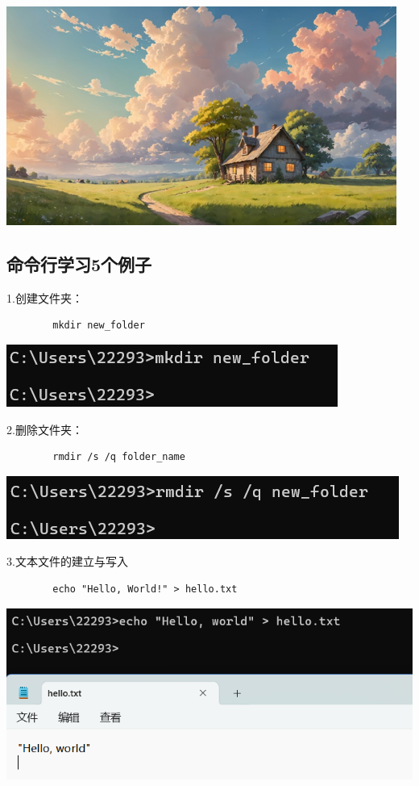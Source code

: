 \documentclass{article}
\begin{document}
	\noindent
	\begin{minipage}{\linewidth}
		\centering
		\includegraphics[width=0.5\linewidth]{suolue.png}
		\label{fig:example}
	\end{minipage}
	
	\subsection{命令行学习5个例子}
	1.创建文件夹：
	\begin{verbatim}
		mkdir new_folder
	\end{verbatim}
	\noindent
	\begin{minipage}{\linewidth}
		\centering
		\includegraphics[width=0.5\linewidth]{example11.png}
		\label{fig:example}
	\end{minipage}
	
	2.删除文件夹：
	\begin{verbatim}
		rmdir /s /q folder_name
	\end{verbatim}
	
	
	\noindent
	\begin{minipage}{\linewidth}
		\centering
		\includegraphics[width=0.5\linewidth]{example12.png}
		\label{fig:example}
	\end{minipage}
	
	3.文本文件的建立与写入
	\begin{verbatim}
		echo "Hello, World!" > hello.txt
	\end{verbatim}
	
	\noindent
	\begin{minipage}{\linewidth}
		\centering
		\includegraphics[width=0.5\linewidth]{example13.png}
		\label{fig:example}
	\end{minipage}
	
\end{document}
